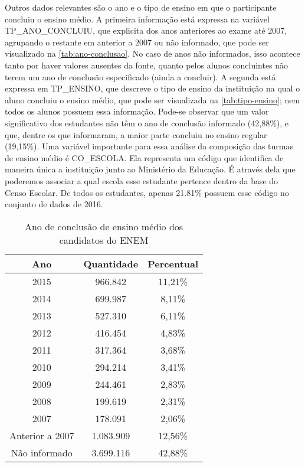   Outros dados relevantes são o ano e o tipo de ensino em que o participante concluiu o ensino médio. A primeira informação está expressa na variável TP\_ANO\_CONCLUIU, que explicita dos anos anteriores ao exame até 2007, agrupando o restante em anterior a 2007 ou não informado, que pode ser visualizado na \autoref{tab:ano-conclusao}. No caso de anos não informados, isso acontece tanto por haver valores ausentes da fonte, quanto pelos alunos concluintes não terem um ano de conclusão especificado (ainda a concluir). A segunda está expressa em TP\_ENSINO, que descreve o tipo de ensino da instituição na qual o aluno concluiu o ensino médio, que pode ser visualizada na \autoref{tab:tipo-ensino}; nem todos os alunos possuem essa informação. Pode-se observar que um valor significativo dos estudantes não têm o ano de conclusão informado (42,88\%), e que, dentre os que informaram, a maior parte concluiu no ensino regular (19,15\%). Uma variável importante para essa análise da composição das turmas de ensino médio é CO\_ESCOLA. Ela representa um código que identifica de maneira única a instituição junto ao Ministério da Educação. É através dela que poderemos associar a qual escola esse estudante pertence dentro da base do Censo Escolar. De todos os estudantes, apenas 21.81\% possuem esse código no conjunto de dados de 2016.

  \begin{table}[h]
    \begin{tabular}{ccc}
    \hline
    \multicolumn{1}{c}{\textbf{Ano}} & \textbf{Quantidade} & \textbf{Percentual} \\ \hline
    2015                             & 966.842              & 11,21\%             \\ \hline
    2014                             & 699.987              & 8,11\%              \\ \hline
    2013                             & 527.310              & 6,11\%              \\ \hline
    2012                             & 416.454              & 4,83\%              \\ \hline
    2011                             & 317.364              & 3,68\%              \\ \hline
    2010                             & 294.214              & 3,41\%              \\ \hline
    2009                             & 244.461              & 2,83\%              \\ \hline
    2008                             & 199.619              & 2,31\%              \\ \hline
    2007                             & 178.091              & 2,06\%              \\ \hline
    Anterior a 2007                  & 1.083.909             & 12,56\%             \\ \hline
    Não informado                    & 3.699.116             & 42,88\%             \\ \hline
    \end{tabular}
    \caption{Ano de conclusão de ensino médio dos candidatos do ENEM}
    \label{tab:ano-conclusao}
    \end{table}

